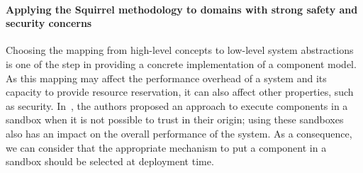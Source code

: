 \paragraph{Applying the Squirrel methodology to domains with strong safety and security concerns}


Choosing the mapping from high-level concepts to low-level system abstractions is one of the step in providing a concrete implementation of a component model.
As this mapping may affect the performance overhead of a system and its capacity to provide resource reservation, it can also affect other properties, such as security.
In~\cite{Gama:2010:SCS:2176905.2176915}, the authors proposed an approach to execute components in a sandbox when it is not possible to trust in their origin; using these sandboxes also has an impact on the overall performance of the system.
As a consequence, we can consider that the appropriate mechanism to put a component in a sandbox should be selected at deployment time.








